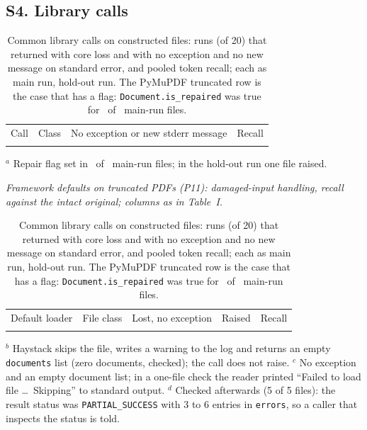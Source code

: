 \subsection*{S4. Library calls}
\begin{table}[H]
\caption{Common library calls on constructed files: runs (of 20) that returned with core loss and with no exception and no new message on standard error, and pooled token recall; each as main run, hold-out run. The PyMuPDF truncated row is the case that has a flag: \texttt{Document.is\_repaired} was true for \pRepaired\ of \pFiles\ main-run files.\label{tab:lib}}
\footnotesize
\begin{ruledtabular}
\begin{tabular}{llcc}
Call & Class & No exception or new stderr message & Recall \\
\colrule

\end{tabular}
\end{ruledtabular}
\raggedright\footnotesize $^{a}$ Repair flag set in \pRepaired\ of \pFiles\ main-run files; in the hold-out run one file raised.

\medskip\centering\emph{Framework defaults on truncated PDFs (P11): damaged-input handling, recall against the intact original; columns as in Table~I.}
\footnotesize
\begin{ruledtabular}
\begin{tabular}{llccc}
Default loader & File class & Lost, no exception & Raised & Recall \\
\colrule

\end{tabular}
\end{ruledtabular}
\raggedright\footnotesize $^{b}$ Haystack skips the file, writes a warning to the log and returns an empty \texttt{documents} list (zero documents, checked); the call does not raise. $^{c}$ No exception and an empty document list; in a one-file check the reader printed ``Failed to load file \ldots\ Skipping'' to standard output. $^{d}$ Checked afterwards (5 of 5 files): the result status was \texttt{PARTIAL\_SUCCESS} with 3 to 6 entries in \texttt{errors}, so a caller that inspects the status is told.
\end{table}

